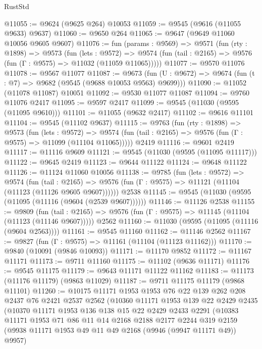 \begin{lexlean}{RustStd}
\begin{coremodule}
@11055 := @9624 (@9625 @264) @10053
@11059 := @9545 (@9616 (@11055 @9633) @9637)
@11060 := @9650 @264
@11065 := @9647 (@9649 @11060 @10056 @9605 @9607)
@11076 := fun (params : @9569) =>
  @9571
    (fun (rty : @1898) =>
    @9573
      (fun (lets : @9572) =>
      @9574 (fun (tail : @2165) => @9576 (fun (Γ : @9575) => @11032 (@11059 @11065)))))
@11077 := @9570 @11076
@11078 := @9567 @11077
@11087 := @9673
    (fun (U : @9672) => @9674 (fun (t : @7) => @9682 (@9545 (@9688 @10053 @9563) @9699)))
@11090 := @11052 (@11078 @11087) @10051
@11092 := @9530 @11077 @11087
@11094 := @9760 @11076 @2417
@11095 := @9597 @2417
@11099 := @9545 (@11030 (@9595 (@11095 @9610)))
@11101 := @11055 (@9632 @2417)
@11102 := @9616 @11101
@11104 := @9545 (@11102 @9637)
@11115 := @9763
    (fun (rty : @1898) =>
    @9573
      (fun (lets : @9572) =>
      @9574 (fun (tail : @2165) => @9576 (fun (Γ : @9575) => @11099 (@11104 @11065)))))
    @2419
@11116 := @9601 @2419
@11117 := @11116 @9609
@11121 := @9545 (@11030 (@9595 (@11095 @11117)))
@11122 := @9645 @2419
@11123 := @9644 @11122
@11124 := @9648 @11122
@11126 := @11124 @11060 @10056
@11138 := @9785
    (fun (lets : @9572) =>
    @9574
      (fun (tail : @2165) =>
      @9576 (fun (Γ : @9575) => @11121 (@11104 (@11123 (@11126 @9605 @9607))))))
    @2538
@11145 := @9545 (@11030 (@9595 (@11095 (@11116 (@9604 (@2539 @9607))))))
@11146 := @11126 @2538
@11155 := @9809
    (fun (tail : @2165) => @9576 (fun (Γ : @9575) => @11145 (@11104 (@11123 (@11146 @9607)))))
    @2562
@11160 := @11030 (@9595 (@11095 (@11116 (@9604 @2563))))
@11161 := @9545 @11160
@11162 := @11146 @2562
@11167 := @9827 (fun (Γ : @9575) => @11161 (@11104 (@11123 @11162)))
@11170 := @9840 (@10091 (@9846 @10093))
@11171 := @11170 @9852
@11172 := @11167 @11171
@11173 := @9711 @11160
@11175 := @11102 (@9636 @11171)
@11176 := @9545 @11175
@11179 := @9643 @11171 @11122 @11162
@11183 := @11173 (@11176 @11179) (@9863 @11029)
@11187 := @9711 @11175 @11179 (@9868 @11101)
@11260 := @10175
    @11171
    @1953
    @1953
    @76
    @22
    @139
    @262
    @208
    @2437
    @76
    @2421
    @2537
    @2562
    (@10360
      @11171
      @1953
      @139
      @22
      @2429
      @2435
      (@10370
        @11171
        @1953
        @136
        @138
        @15
        @22
        @2429
        @2433
        @2291
        (@10383
          @11171
          @1953
          @71
          @86
          @11
          @14
          @2168
          @2188
          @2177
          @2244
          @319
          @2159
          (@9938 @11171 @1953 @49 @11 @49 @2168 (@9946 (@9947 @11171 @49)) @9957)

\end{coremodule}
\end{lexlean}
